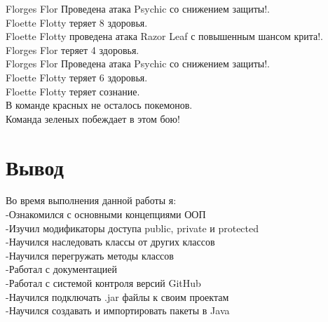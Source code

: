 \noindent Florges Flor Проведена атака Psychic со снижением защиты!.  \\
Floette Flotty теряет 8 здоровья. \\

\noindent Floette Flotty проведена атака Razor Leaf с повышенным шансом крита!. \\
Florges Flor теряет 4 здоровья. \\

\noindent Florges Flor Проведена атака Psychic со снижением защиты!. \\
Floette Flotty теряет 6 здоровья. \\
Floette Flotty теряет сознание. \\
В команде красных не осталось покемонов. \\
Команда зеленых побеждает в этом бою! \\
\section{Вывод}
Во время выполнения данной работы я: \\
-Ознакомился с основными концепциями ООП \\
-Изучил модификаторы доступа public, private и protected \\
-Научился наследовать классы от других классов \\
-Научился перегружать методы классов \\
-Работал с документацией \\
-Работал с системой контроля версий GitHub \\
-Научился подключать .jar файлы к своим проектам \\
-Научился создавать и импортировать пакеты в Java


